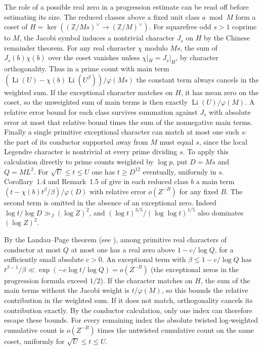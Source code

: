 \documentclass[11pt]{amsart}
\theoremstyle{definition}
\theoremstyle{remark}
\begin{document}
The role of a possible real zero in a progression estimate can be
read off before estimating its size. The reduced classes above a
fixed unit class $a\bmod M$ form a coset of
$H=\ker((\mathbb Z/Ms)^\times\to(\mathbb Z/M)^\times)$.
For squarefree odd $s>1$ coprime to $M$, the Jacobi symbol induces
a nontrivial character $J_s$ on $H$ by the Chinese remainder theorem.
For any real character $\chi$ modulo $Ms$, the sum of
$J_s(b)\chi(b)$ over the coset vanishes unless $\chi|_H=J_s|_H$,
by character orthogonality. Thus in a prime count with main term
$(\operatorname{Li}(U)-\chi(b)\operatorname{Li}(U^\beta))/\varphi(Ms)$
the constant term always cancels in the weighted sum. If the
exceptional character matches on $H$, it has mean zero on the
coset, so the unweighted sum of main terms is then exactly
$\operatorname{Li}(U)/\varphi(M)$. A relative error bound for
each class survives summation against $J_s$ with absolute error
at most that relative bound times the sum of the nonnegative main
terms. Finally a single primitive exceptional character can match
at most one such $s$: the part of its conductor supported away
from $M$ must equal $s$, since the local Legendre character is
nontrivial at every prime dividing $s$. To apply this calculation directly to prime counts weighted
by $\log p$, put $D=Ms$ and $Q=ML^2$. For
$\sqrt U\le t\le U$ one has $t\ge D^{12}$ eventually, uniformly
in $s$. Corollary~1.4 and Remark~1.5 of \cite{ThornerZaman} give
in each reduced class $b$ a main term
$(t-\chi(b)t^\beta/\beta)/\varphi(D)$ with relative error
$o(Z^{-B})$ for any fixed $B$. The second term is omitted in the
absence of an exceptional zero. Indeed $\log t/\log D\gg_J
(\log Z)^2$, and $(\log t)^{3/5}/(\log\log t)^{1/5}$
also dominates $(\log Z)^2$.

By the Landau--Page theorem (see \cite{IK}), among primitive real
characters of conductor at most $Q$ at most one has a real zero
above $1-c/\log Q$, for a sufficiently small absolute $c>0$.
An exceptional term with $\beta\le1-c/\log Q$ has
$t^{\beta-1}/\beta\ll\exp(-c\log t/\log Q)=o(Z^{-B})$
(the exceptional zeros in the progression formula exceed $1/2$).
If the character matches on $H$, the sum of the main terms
without the Jacobi weight is $t/\varphi(M)$, so this bounds the
relative contribution in the weighted sum. If it does not match,
orthogonality cancels its contribution exactly. By the conductor
calculation, only one index can therefore escape these bounds.
For every remaining index the absolute twisted log-weighted
cumulative count is $o(Z^{-B})$ times the untwisted cumulative
count on the same coset, uniformly for $\sqrt U\le t\le U$.
\end{document}
